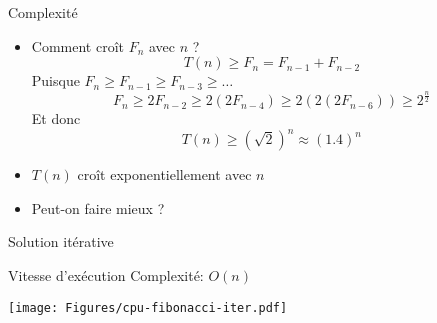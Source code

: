 \begin{frame}{Complexité}

\begin{itemize}
\item Comment croît $F_n$ avec $n$ ?
$$T(n)\geq F_n=F_{n-1}+F_{n-2}$$
Puisque $F_n\geq F_{n-1}\geq F_{n-3}\geq\ldots$
$$F_n\geq 2 F_{n-2}\geq 2(2 F_{n-4})\geq 2(2(2 F_{n-6})) \geq 2^{\frac{n}{2}}$$
Et donc
$$T(n)\geq (\sqrt{2})^n \approx (1.4)^n$$
\item $T(n)$ croît \alert{exponentiellement} avec $n$

\bigskip

\item Peut-on faire mieux ?
\end{itemize}
\end{frame}

\begin{frame}{Solution itérative}

\begin{center}
\end{center}


\end{frame}

\begin{frame}{Vitesse d'exécution}
Complexité: $O(n)$

\bigskip

\centerline{\texttt{[image: Figures/cpu-fibonacci-iter.pdf]}}

\end{frame}

